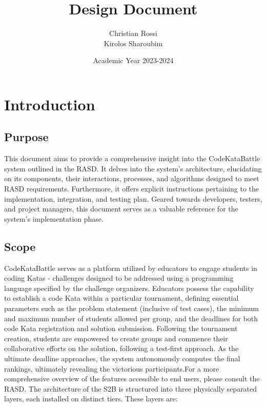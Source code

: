 \documentclass[12pt, a4paper]{report}
\title{Design Document}
\author{Christian Rossi \\ Kirolos Sharoubim}
\date{Academic Year 2023-2024}
\begin{document}
\maketitle

\newpage

\tableofcontents

\newpage

\chapter{Introduction}
    \section{Purpose}
    This document aims to provide a comprehensive insight into the CodeKataBattle system outlined in the RASD.
    It delves into the system's architecture, elucidating on its components,
    their interactions, processes, and algorithms designed to meet RASD requirements. 
    Furthermore, it offers explicit instructions pertaining to the implementation, integration, and testing plan. 
    Geared towards developers, testers, and project managers, this document serves as a valuable reference for the system's implementation phase.

    \section{Scope}
    CodeKataBattle serves as a platform utilized by educators to engage students in coding Katas - challenges designed to be addressed using a programming language specified by the challenge organizers. 
    Educators possess the capability to establish a code Kata within a particular tournament, defining essential parameters such as the problem statement (inclusive of test cases), 
    the minimum and maximum number of students allowed per group, and the deadlines for both code Kata registration and solution submission.
    Following the tournament creation, students are empowered to create groups and commence their collaborative efforts on the solution, following a test-first approach. 
    As the ultimate deadline approaches, the system autonomously computes the final rankings, ultimately revealing the victorious participants.For a more comprehensive overview of the features accessible to end users, please consult the RASD. 
    The architecture of the S2B is structured into three physically separated layers, each installed on distinct tiers. These layers are:
    \\
    
\end{document}
